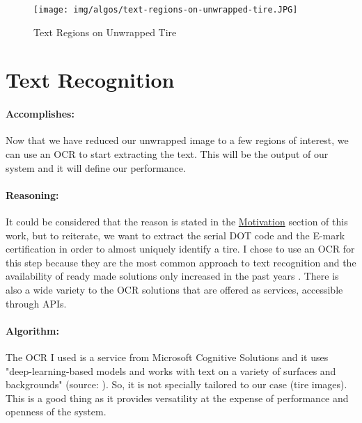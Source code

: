 \begin{figure}
    \centering
    \texttt{[image: img/algos/text-regions-on-unwrapped-tire.JPG]}
    \caption{Text Regions on Unwrapped Tire}
    \label{fig:text-regions-on-unwrapped-tire}
\end{figure}

\section{Text Recognition}\label{sec:text-recognition}

\paragraph*{Accomplishes:}\mbox{}\par

Now that we have reduced our unwrapped image to a few regions of interest, we can use an OCR to start extracting the text. This will be the output of our system and it will define our performance.

\paragraph*{Reasoning:}\mbox{}\par

It could be considered that the reason is stated in the \hyperref[sec:motivation]{Motivation} section of this work, but to reiterate, we want to extract the serial DOT code and the E-mark certification in order to almost uniquely identify a tire. I chose to use an OCR for this step because they are the most common approach to text recognition and the availability of ready made solutions only increased in the past years \cite{site:OCR_comparison}. There is also a wide variety to the OCR solutions that are offered as services, accessible through APIs.

\paragraph*{Algorithm:}\mbox{}\par
The OCR I used is a service from Microsoft Cognitive Solutions \cite{site:Microsoft_Cognitive_Services} and it uses "deep-learning-based models and works with text on a variety of surfaces and backgrounds" (source: \cite{site:Microsoft_Cognitive_Services-Explained}). So, it is not specially tailored to our case (tire images). This is a good thing as it provides versatility at the expense of performance and openness of the system.

